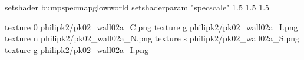 setshader bumpspecmapglowworld
setshaderparam "specscale" 1.5 1.5 1.5


texture 0 philipk2/pk02_wall02a_C.png
texture g philipk2/pk02_wall02a_I.png
texture n philipk2/pk02_wall02a_N.png
texture s philipk2/pk02_wall02a_S.png
texture g philipk2/pk02_wall02a_I.png

